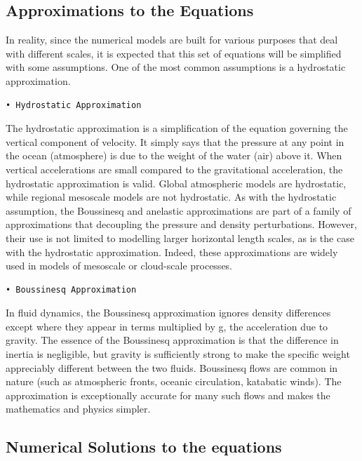 \documentclass[12pt,oneside]{book}
\begin{document}
\subsection{Approximations to the
Equations}\label{approximations-to-the-equations}

In reality, since the numerical models are built for various purposes
that deal with different scales, it is expected that this set of
equations will be simplified with some assumptions. One of the most
common assumptions is a hydrostatic approximation.

\begin{verbatim}
• Hydrostatic Approximation
\end{verbatim}

The hydrostatic approximation is a simplification of the equation
governing the vertical component of velocity. It simply says that the
pressure at any point in the ocean (atmosphere) is due to the weight of
the water (air) above it. When vertical accelerations are small compared
to the gravitational acceleration, the hydrostatic approximation is
valid. Global atmospheric models are hydrostatic, while regional
mesoscale models are not hydrostatic. As with the hydrostatic
assumption, the Boussinesq and anelastic approximations are part of a
family of approximations that decoupling the pressure and density
perturbations. However, their use is not limited to modelling larger
horizontal length scales, as is the case with the hydrostatic
approximation. Indeed, these approximations are widely used in models of
mesoscale or cloud-scale processes.

\begin{verbatim}
• Boussinesq Approximation
\end{verbatim}

In fluid dynamics, the Boussinesq approximation ignores density
differences except where they appear in terms multiplied by g, the
acceleration due to gravity. The essence of the Boussinesq approximation
is that the difference in inertia is negligible, but gravity is
sufficiently strong to make the specific weight appreciably different
between the two fluids. Boussinesq flows are common in nature (such as
atmospheric fronts, oceanic circulation, katabatic winds). The
approximation is exceptionally accurate for many such flows and makes
the mathematics and physics simpler.

\subsection{Numerical Solutions to the
equations}\label{numerical-solutions-to-the-equations}
\end{document}
